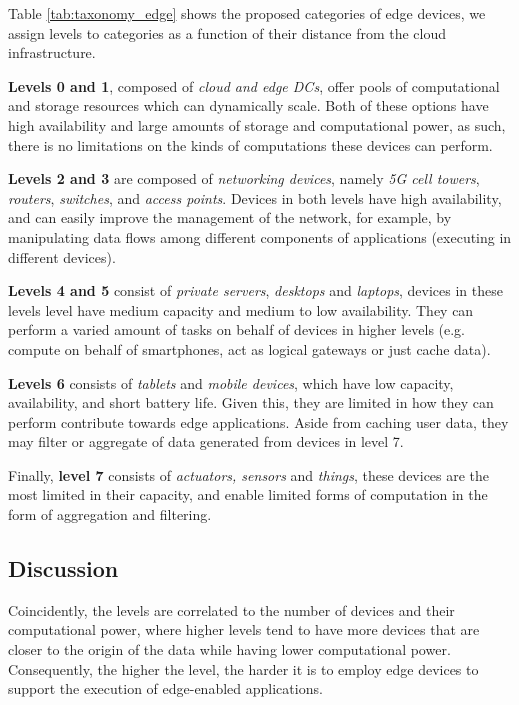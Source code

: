 Table \ref{tab:taxonomy_edge} shows the proposed categories of edge devices, we assign levels to categories as a function of their distance from the cloud infrastructure. 

\textbf{Levels 0 and 1}, composed of \textit{cloud and edge DCs}, offer pools of computational and storage resources which can dynamically scale. Both of these options have high availability and large amounts of storage and computational power, as such, there is no limitations on the kinds of computations these devices can perform.

\textbf{Levels 2 and 3} are composed of \textit{networking devices}, namely 
\textit{5G cell towers}, \textit{routers}, \textit{switches}, and \textit{access points}. Devices in both levels have high availability, and can easily improve the management of the network, for example, by manipulating data flows among different components of applications (executing in different devices).

\textbf{Levels 4 and  5} consist of \textit{private servers}, \textit{desktops} and \textit{laptops}, devices in these levels level have medium capacity and medium to low availability. They can perform a varied amount of tasks on behalf of devices in higher levels (e.g. compute on behalf of smartphones, act as logical gateways or just cache data). 

\textbf{Levels 6} consists of \textit{tablets} and \textit{mobile devices}, which have low capacity, availability, and short battery life. Given this, they are limited in how they can perform contribute towards edge applications. Aside from caching user data, they may filter or aggregate of data generated from devices in level 7.

Finally, \textbf{level 7} consists of \textit{actuators, sensors} and \textit{things}, these devices are the most limited in their capacity, and enable limited forms of computation in the form of aggregation and filtering.

\subsection{Discussion}

Coincidently, the levels are correlated to the number of devices and their computational power, where higher levels tend to have more devices that are closer to the origin of the data while having lower computational power. Consequently, the higher the level, the harder it is to employ edge devices to support the execution of edge-enabled applications. 

